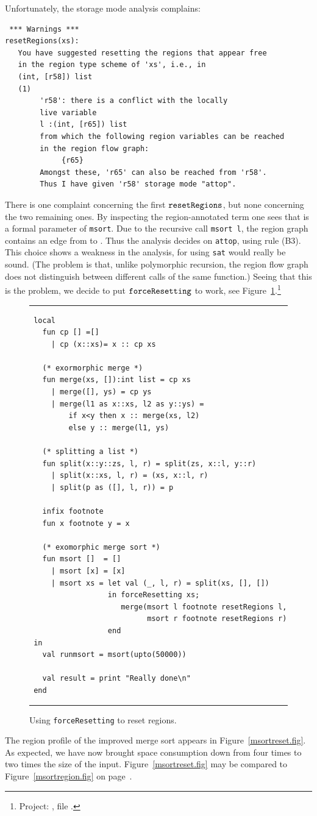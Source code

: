 \documentclass[12pt]{book}
\begin{document}
Unfortunately, the storage mode analysis complains:
\begin{verbatim}
 *** Warnings ***
resetRegions(xs): 
   You have suggested resetting the regions that appear free 
   in the region type scheme of 'xs', i.e., in
   (int, [r58]) list
   (1)                                                    
        'r58': there is a conflict with the locally
        live variable
        l :(int, [r65]) list
        from which the following region variables can be reached 
        in the region flow graph:
             {r65}
        Amongst these, 'r65' can also be reached from 'r58'.
        Thus I have given 'r58' storage mode "attop".
\end{verbatim}
There is one complaint
concerning the first $\hbox{\tt resetRegions}$, but none concerning the two remaining
ones.  By inspecting the region-annotated term
one sees that  is a formal parameter of
{\tt msort}.  Due to the recursive call {\tt msort l}, the region
graph contains an edge from  to . Thus the
analysis decides on {\tt attop}, using rule (B3). This choice shows a weakness
in the analysis, for using {\tt sat} would really be sound. (The
problem is that, unlike polymorphic recursion, the region flow graph
does not distinguish between different calls of the same function.)
Seeing that this is the problem, we decide to put $\hbox{\tt forceResetting}$ to work,
see Figure~\ref{force.fig}.\footnote{Project:   , file
  .} 
\begin{figure}
\hrule\medskip
\begin{verbatim}
 local
   fun cp [] =[]
     | cp (x::xs)= x :: cp xs

   (* exormorphic merge *)
   fun merge(xs, []):int list = cp xs
     | merge([], ys) = cp ys
     | merge(l1 as x::xs, l2 as y::ys) = 
         if x<y then x :: merge(xs, l2) 
         else y :: merge(l1, ys)

   (* splitting a list *)
   fun split(x::y::zs, l, r) = split(zs, x::l, y::r)
     | split(x::xs, l, r) = (xs, x::l, r)
     | split(p as ([], l, r)) = p

   infix footnote
   fun x footnote y = x

   (* exomorphic merge sort *)
   fun msort []  = []
     | msort [x] = [x]
     | msort xs = let val (_, l, r) = split(xs, [], [])
                  in forceResetting xs;
                     merge(msort l footnote resetRegions l, 
                           msort r footnote resetRegions r)
                  end
 in
   val runmsort = msort(upto(50000))

   val result = print "Really done\n"
 end
\end{verbatim}
\caption{Using {\tt forceResetting} to reset regions.}
\medskip
\hrule
\label{force.fig}
\end{figure}
The region profile of the improved merge sort appears in 
Figure~\ref{msortreset.fig}. As expected, we have
now brought space consumption down from four times to two times the size of the
input. 
Figure~\ref{msortreset.fig}
may be compared to Figure~\ref{msortregion.fig} on page~\pageref{msortregion.fig}.
\end{document}
